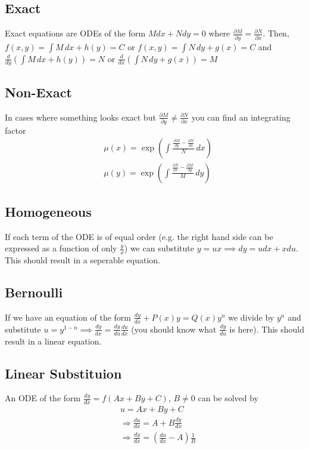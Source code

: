 \documentclass[10pt,landscape,letterpaper]{cheatsheet}
\begin{document}
\subsection*{Exact}
Exact equations are ODEs of the form $Mdx+Ndy=0$ where $\frac{\partial M}{\partial y}=\frac{\partial N}{\partial x}$. Then, $f(x,y)=\int M\,dx+h(y)=C$ or $f(x,y)=\int N\,dy+g(x)=C$
and $\frac{d}{dy}\left(\int M\,dx+h(y)\right)=N$ or $\frac{d}{dx}\left(\int N\,dy+g(x)\right)=M$
\subsection*{Non-Exact}
In cases where something looks exact but $\frac{\partial M}{\partial y}\neq\frac{\partial N}{\partial x}$ you can find an integrating factor
\begin{align*}
         & \mu(x)=\exp\left(\int \frac{\frac{\partial M}{\partial y}-\frac{\partial N}{\partial x}}{N}\,dx\right) \\
         & \mu(y)=\exp\left(\int \frac{\frac{\partial N}{\partial x}-\frac{\partial M}{\partial y}}{M}\,dy\right)
\end{align*}
\subsection*{Homogeneous}
If each term of the ODE is of equal order (e.g. the right hand side can be expressed as a function of only $\frac{y}{x}$) we can substitute
$y=ux\implies dy=udx+xdu$. This should result in a seperable equation.
\subsection*{Bernoulli}
If we have an equation of the form $\frac{dy}{dx}+P(x)y=Q(x)y^n$ we divide by $y^n$ and substitute $u=y^{1-n}\implies \frac{dy}{dx}=\frac{dy}{du}\frac{du}{dx}$ (you should know what $\frac{dy}{du}$ is here). This should result in a linear equation.
\subsection*{Linear Substituion}
An ODE of the form $\frac{dy}{dx}=f(Ax+By+C), \, B\neq 0$ can be solved by
\begin{align*}
         & u = Ax+By+C                                            \\
         & \Rightarrow \frac{du}{dx}=A+B\frac{dy}{dx}             \\
         & \Rightarrow \frac{dy}{dx}=(\frac{du}{dx}-A)\frac{1}{B} \\
\end{align*}
\end{document}
